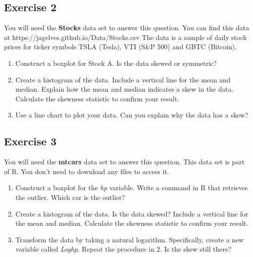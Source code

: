 \documentclass[
  letterpaper,
  DIV=11,
  numbers=noendperiod]{scrreprt}
\providecommand{\tightlist}{%
  \setlength{\itemsep}{0pt}\setlength{\parskip}{0pt}}\usepackage{longtable,booktabs,array}
\begin{document}
\hypertarget{exercise-2-8}{%
\subsection*{Exercise 2}\label{exercise-2-8}}

You will need the \textbf{Stocks} data set to answer this question. You
can find this data at https://jagelves.github.io/Data/Stocks.csv The
data is a sample of daily stock prices for ticker symbols TSLA (Tesla),
VTI (S\&P 500) and GBTC (Bitcoin).

\begin{enumerate}
\def\labelenumi{\arabic{enumi}.}
\tightlist
\item
  Construct a boxplot for Stock A. Is the data skewed or symmetric?
\item
  Create a histogram of the data. Include a vertical line for the mean
  and median. Explain how the mean and median indicates a skew in the
  data. Calculate the skewness statistic to confirm your result.
\item
  Use a line chart to plot your data. Can you explain why the data has a
  skew?
\end{enumerate}

\hypertarget{exercise-3-8}{%
\subsection*{Exercise 3}\label{exercise-3-8}}

You will need the \textbf{mtcars} data set to answer this question. This
data set is part of R. You don't need to download any files to access
it.

\begin{enumerate}
\def\labelenumi{\arabic{enumi}.}
\tightlist
\item
  Construct a boxplot for the \emph{hp} variable. Write a command in R
  that retrieves the outlier. Which car is the outlier?
\item
  Create a histogram of the data. Is the data skewed? Include a vertical
  line for the mean and median. Calculate the skewness statistic to
  confirm your result.
\item
  Transform the data by taking a natural logarithm. Specifically, create
  a new variable called \emph{Loghp}. Repeat the procedure in 2. Is the
  skew still there?
\end{enumerate}
\end{document}

